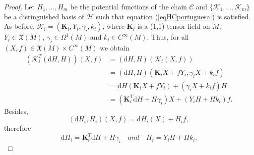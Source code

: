 \documentclass[10pt,a4paper]{amsart}
\newcommand{\bs}{\boldsymbol}
\newcommand{\rd}{\mathrm{d}}
\begin{document}
\begin{proof}
Let $H_{1},\ldots,H_{m}$ be the potential functions of the chain $\mathscr{C}$ and $\lbrace \bs{\mathcal{K}}_{1},\ldots,\bs{\mathcal{K}}_{m}\rbrace$ be a distinguished basis of $\mathscr{H}$ such that equation (\ref{eqHCportuguesa}) is satisfied. 
As before, $\bs{\mathcal{K}}_{i}=(\bs{K}_{i},Y_{i},\gamma_{i},k_{i})$, where $\bs{K}_{i}$ is a (1,1)-tensor field on $M$, $Y_{i}\in \mathfrak{X}(M)$, $\gamma_{i}\in \Omega^{1}(M)$ and $k_{i}\in C^{\infty}(M)$. Thus, for all $(X,f)\in\mathfrak{X}(M)\times C^{\infty}(M)$ we obtain
\begin{equation}
\begin{split}
\left( \bs{\mathcal{K}}_{i}^{T}(\rd H,H)\right)(X,f)&=(\rd H,H)\left( \bs{\mathcal{K}}_{i}(X,f)\right)\\
&=(\rd H,H)(\bs{K}_{i}X+fY_{i},\gamma_{i}X+k_{i}f)\\
&=\rd H(\bs{K}_{i}X+fY_{i})+(\gamma_{i}X+k_{i}f)H\\
&=(\bs{K}_{i}^{T}\rd H+H\gamma_{i})X+(Y_{i}H+Hk_{i})f.
\end{split}
\end{equation}
Besides,
\begin{equation}
(\rd H_{i},H_{i})(X,f)=\rd H_{i}(X)+H_{i}f,
\end{equation}
therefore
\begin{equation}
\label{dHi,Hi}
\rd H_{i}=\bs{K}_{i}^{T}\rd H+H\gamma_{i}\quad\textit{and}\quad H_{i}=Y_{i}H+Hk_{i}.
\end{equation}


\end{proof}
\end{document}
